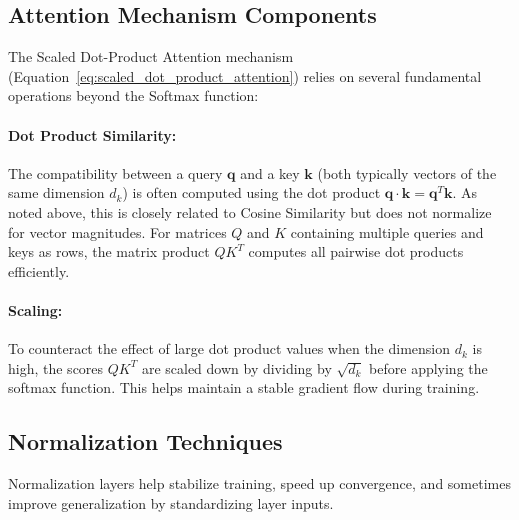 \begin{appendices}
  \subsection{Attention Mechanism Components}
  The Scaled Dot-Product Attention mechanism (Equation~\ref{eq:scaled_dot_product_attention}) relies on several fundamental operations beyond the Softmax function:

  \paragraph{Dot Product Similarity:}
  The compatibility between a query \( \bm{q} \) and a key \( \bm{k} \) (both typically vectors of the same dimension \( d_k \)) is often computed using the dot product \( \bm{q} \cdot \bm{k} = \bm{q}^T \bm{k} \). As noted above, this is closely related to Cosine Similarity but does not normalize for vector magnitudes. For matrices \( Q \) and \( K \) containing multiple queries and keys as rows, the matrix product \( QK^T \) computes all pairwise dot products efficiently.

  \paragraph{Scaling:}
  To counteract the effect of large dot product values when the dimension \( d_k \) is high, the scores \( QK^T \) are scaled down by dividing by \( \sqrt{d_k} \) before applying the softmax function. This helps maintain a stable gradient flow during training.

  \subsection{Normalization Techniques}
  Normalization layers help stabilize training, speed up convergence, and sometimes improve generalization by standardizing layer inputs.


\end{appendices}

